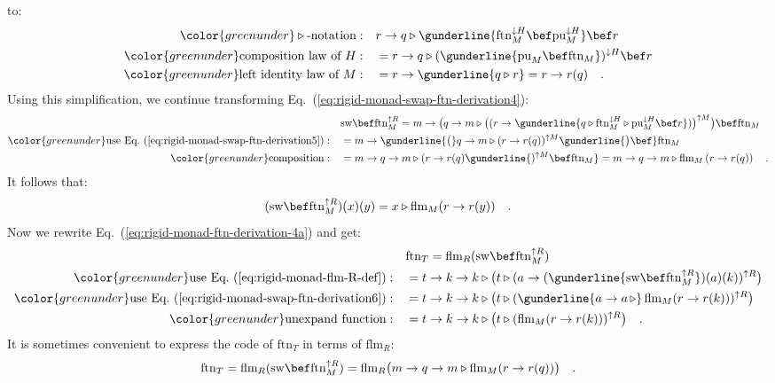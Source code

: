 to:
\begin{align}
{\color{greenunder}\triangleright\text{-notation}:}\quad & r\rightarrow q\triangleright\gunderline{\text{ftn}_{M}^{\downarrow H}\bef\text{pu}_{M}^{\downarrow H}}\bef r\nonumber \\
{\color{greenunder}\text{composition law of }H:}\quad & =r\rightarrow q\triangleright(\gunderline{\text{pu}_{M}\bef\text{ftn}_{M}})^{\downarrow H}\bef r\nonumber \\
{\color{greenunder}\text{left identity law of }M:}\quad & =r\rightarrow\gunderline{q\triangleright r}=r\rightarrow r(q)\quad.\label{eq:rigid-monad-swap-ftn-derivation5}
\end{align}
Using this simplification, we continue transforming Eq.~(\ref{eq:rigid-monad-swap-ftn-derivation4}):
\begin{align*}
 & \text{sw}\bef\text{ftn}_{M}^{\uparrow R}=m\rightarrow\big(q\rightarrow m\triangleright\big((r\rightarrow\gunderline{q\triangleright\text{ftn}_{M}^{\downarrow H}\triangleright\text{pu}_{M}^{\downarrow H}\bef r})\big)^{\uparrow M}\big)\bef\text{ftn}_{M}\\
{\color{greenunder}\text{use Eq.~(\ref{eq:rigid-monad-swap-ftn-derivation5})}:}\quad & =m\rightarrow\gunderline{\big(}q\rightarrow m\triangleright(r\rightarrow r(q))^{\uparrow M}\gunderline{\big)\bef}\text{ftn}_{M}\\
{\color{greenunder}\text{composition}:}\quad & =m\rightarrow q\rightarrow m\triangleright(r\rightarrow r(q)\gunderline{)^{\uparrow M}\bef\text{ftn}_{M}}=m\rightarrow q\rightarrow m\triangleright\text{flm}_{M}\left(r\rightarrow r(q)\right)\quad.
\end{align*}
It follows that:
\begin{equation}
(\text{sw}\bef\text{ftn}_{M}^{\uparrow R})(x)(y)=x\triangleright\text{flm}_{M}(r\rightarrow r(y))\quad.\label{eq:rigid-monad-swap-ftn-derivation6}
\end{equation}
Now we rewrite Eq.~(\ref{eq:rigid-monad-ftn-derivation-4a}) and
get:
\begin{align*}
 & \text{ftn}_{T}=\text{flm}_{R}(\text{sw}\bef\text{ftn}_{M}^{\uparrow R})\\
{\color{greenunder}\text{use Eq.~(\ref{eq:rigid-monad-flm-R-def})}:}\quad & =t\rightarrow k\rightarrow k\triangleright\big(t\triangleright(a\rightarrow(\gunderline{\text{sw}\bef\text{ftn}_{M}^{\uparrow R}})(a)(k))^{\uparrow R}\big)\\
{\color{greenunder}\text{use Eq.~(\ref{eq:rigid-monad-swap-ftn-derivation6})}:}\quad & =t\rightarrow k\rightarrow k\triangleright\big(t\triangleright(\gunderline{a\rightarrow a\,\triangleright}\,\text{flm}_{M}(r\rightarrow r(k)))^{\uparrow R}\big)\\
{\color{greenunder}\text{unexpand function}:}\quad & =t\rightarrow k\rightarrow k\triangleright\big(t\triangleright(\text{flm}_{M}(r\rightarrow r(k)))^{\uparrow R}\big)\quad.
\end{align*}
It is sometimes convenient to express the code of $\text{ftn}_{T}$
in terms of $\text{flm}_{R}$:
\[
\text{ftn}_{T}=\text{flm}_{R}(\text{sw}\bef\text{ftn}_{M}^{\uparrow R})=\text{flm}_{R}\big(m\rightarrow q\rightarrow m\triangleright\text{flm}_{M}(r\rightarrow r(q))\big)\quad.
\]


